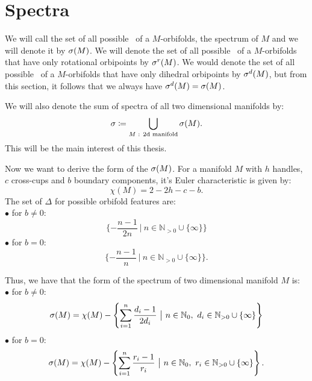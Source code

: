 

\section{Spectra}\label{spectra}
We will call the set of all possible \Eoc\ of a $M$-orbifolds, the spectrum of $M$ and 
we will denote it by ${{\sigma}(M)}$. We will denote the set of all possible \Eoc\ of a $M$-orbifolds 
that have only rotational orbipoints by ${\sigma}^r(M)$. 
We would denote the set of all possible \Eoc\ of a $M$-orbifolds 
that have only dihedral orbipoints by ${\sigma}^d(M)$, but from this section, it follows that 
we always have ${\sigma}^d(M) = {{\sigma}(M)}$. 

We will also denote the sum of spectra of all two dimensional manifolds by:
\begin{equation}
{\sigma} \coloneqq \bigcup_{M\textrm{ : 2d manifold}} {{\sigma}(M)}.
\end{equation}
This will be the main interest of this thesis. 

Now we want to derive the form of the ${{\sigma}(M)}$.
For a manifold $M$ with $h$ handles, $c$ cross-cups and $b$ boundary components, it's 
Euler characteristic is given by:
\begin{equation}
\chi(M) = 2-2h-c-b.
\end{equation}
The set of $\Delta$ for possible orbifold features are:\\
$\bullet$ for $b\neq 0$:
\begin{equation}
\{-\frac{n-1}{2n}\ \big|\ n\in\mathbb{N}_{>0}\cup \{\infty\}\}
\end{equation}
$\bullet$ for $b = 0$:
\begin{equation}
\{-\frac{n-1}{n}\ \big|\ n\in\mathbb{N}_{>0}\cup \{\infty\}\}.
\end{equation} 

Thus, we have that the form of the spectrum of two dimensional manifold $M$ is:\\
$\bullet$ for $b\neq 0$: 
\begin{equation}
\spe(M) = \chi(M) - \left\{\sum\limits_{i=1}^n\frac{d_i-1}{2d_i}\ 
\big|\ n\in\mathbb{N}_0,\ d_i\in\mathbb{N}_{>0}\cup \{\infty\}\right\}
\end{equation}
$\bullet$ for $b = 0$:
\begin{equation}
\spe(M) = \chi(M) - \left\{\sum\limits_{i=1}^n \frac{r_i-1}{r_i}\ \big|\ n\in\mathbb{N}_0,\ 
r_i\in\mathbb{N}_{>0}\cup \{\infty\}\right\}.
\end{equation} 
\label{two dim manifold spectrum}


